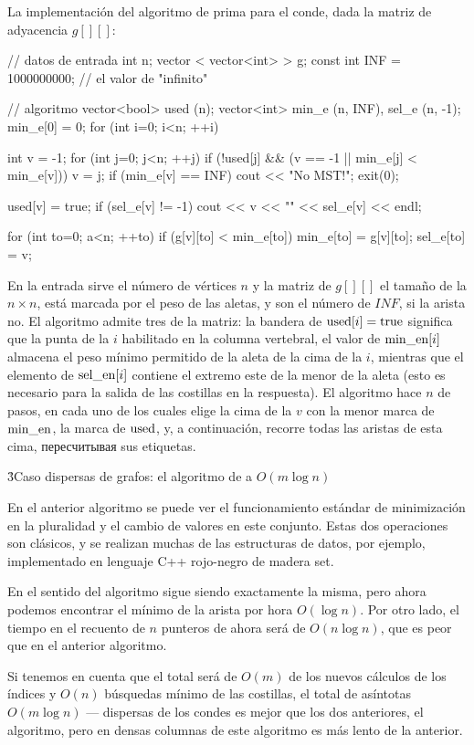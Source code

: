 La implementación del algoritmo de prima para el conde, dada la matriz de adyacencia $g[][]$:

\code
// datos de entrada
int n;
vector < vector<int> > g;
const int INF = 1000000000; // el valor de "infinito"

// algoritmo
vector<bool> used (n);
vector<int> min_e (n, INF), sel_e (n, -1);
min_e[0] = 0;
for (int i=0; i<n; ++i) {
int v = -1;
for (int j=0; j<n; ++j)
if (!used[j] && (v == -1 || min_e[j] < min_e[v]))
v = j;
if (min_e[v] == INF) {
cout << "No MST!";
exit(0);
}

used[v] = true;
if (sel_e[v] != -1)
cout << v << "" << sel_e[v] << endl;

for (int to=0; a<n; ++to)
if (g[v][to] < min_e[to]) {
min_e[to] = g[v][to];
sel_e[to] = v;
}
}
\endcode

En la entrada sirve el número de vértices $n$ y la matriz de $g[][]$ el tamaño de la $n \times n$, está marcada por el peso de las aletas, y son el número de $INF$, si la arista no. El algoritmo admite tres de la matriz: la bandera de ${\rm used}[i] = {\rm true}$ significa que la punta de la $i$ habilitado en la columna vertebral, el valor de ${\rm min\_en}[i]$ almacena el peso mínimo permitido de la aleta de la cima de la $i$, mientras que el elemento de ${\rm sel\_en}[i]$ contiene el extremo este de la menor de la aleta (esto es necesario para la salida de las costillas en la respuesta). El algoritmo hace $n$ de pasos, en cada uno de los cuales elige la cima de la $v$ con la menor marca de ${\rm min\_en}$, la marca de $\rm used$, y, a continuación, recorre todas las aristas de esta cima, пересчитывая sus etiquetas.


\h3{Caso dispersas de grafos: el algoritmo de a $O(m \log n)$}

En el anterior algoritmo se puede ver el funcionamiento estándar de minimización en la pluralidad y el cambio de valores en este conjunto. Estas dos operaciones son clásicos, y se realizan muchas de las estructuras de datos, por ejemplo, implementado en lenguaje C++ rojo-negro de madera set.

En el sentido del algoritmo sigue siendo exactamente la misma, pero ahora podemos encontrar el mínimo de la arista por hora $O(\log n)$. Por otro lado, el tiempo en el recuento de $n$ punteros de ahora será de $O(n \log n)$, que es peor que en el anterior algoritmo.

Si tenemos en cuenta que el total será de $O(m)$ de los nuevos cálculos de los índices y $O(n)$ búsquedas mínimo de las costillas, el total de asíntotas $O(m \log n)$ --- dispersas de los condes es mejor que los dos anteriores, el algoritmo, pero en densas columnas de este algoritmo es más lento de la anterior.

